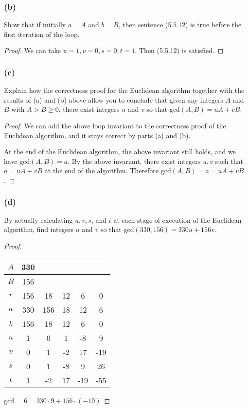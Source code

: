 \documentclass[14pt]{extarticle}
\begin{document}
\subsubsection{(b)}
Show that if initially $a = A$ and $b = B$, then sentence (5.5.12) is true before the first iteration of the loop.

\begin{proof}
    We can take $u = 1, v = 0, s = 0, t = 1$. Then (5.5.12) is satisfied.
\end{proof}

\subsubsection{(c)}
Explain how the correctness proof for the Euclidean algorithm together with the results of (a) and (b) above
allow you to conclude that given any integers $A$ and $B$
with $A > B \geq 0$, there exist integers $u$ and $v$ so
that gcd$(A, B) = uA + vB$.

\begin{proof}
    We can add the above loop invariant to the correctness proof of the Euclidean algorithm, and it stays correct by parts (a) and (b).

    At the end of the Euclidean algorithm, the above invariant still holds, and we have gcd$(A,B) = a$.
    By the above invariant, there exist integers $u,v$ such that $a = uA + vB$ at the end of the algorithm.
    Therefore gcd$(A,B) = a = uA + vB$.
\end{proof}

\subsubsection{(d)}
By actually calculating $u, v, s$, and $t$ at each stage of execution of the Euclidean algorithm, find integers $u$ and
$v$ so that gcd$(330, 156) = 330u + 156v$.

\begin{proof}
    \begin{tabular}{|c|c|c|c|c|c|}
        \hline
        $A$ & 330 &     &    &     &     \\
        \hline
        $B$ & 156 &     &    &     &     \\
        \hline
        $r$ & 156 & 18  & 12 & 6   & 0   \\
        \hline
        $a$ & 330 & 156 & 18 & 12  & 6   \\
        \hline
        $b$ & 156 & 18  & 12 & 6   & 0   \\
        \hline
        $u$ & 1   & 0   & 1  & -8  & 9   \\
        \hline
        $v$ & 0   & 1   & -2 & 17  & -19 \\
        \hline
        $s$ & 0   & 1   & -8 & 9   & 26  \\
        \hline
        $t$ & 1   & -2  & 17 & -19 & -55 \\
        \hline
    \end{tabular}
    gcd = $6 = 330 \cdot 9 + 156 \cdot (-19)$
\end{proof}
\end{document}
